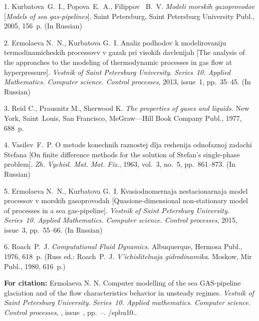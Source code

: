 

{\footnotesize

\vskip 4mm


\vskip 4mm

1.  Kurbatova~G.~I.,  Popova~E.~A.,  Filippov~ B.~V.
\textit{Modeli morskih gazoprovodov} [\textit{Models of sea
gas-pipelines}]. Saint Petersburg, Saint Petersburg University
Publ.,  2005, 156~p. (In Russian)

2.  Ermolaeva N.~N., Kurbatova G.~I. Analiz podhodov k
modelirovaniju termodinamicheskih processovv v gazah pri visokih
davlenijah [The analysis of the approaches to the modeling of
thermodynamic processes in gas flow at hyperpressure].
\textit{Vestnik of Saint Petersburg University. Series~10. Applied
Mathematics. Computer science. Control processes}, 2013, issue~1,
pp.~35--45. (In Russian)


3.  Reid  C., Prausnitz  M., Sherwood  K. \textit{The properties
of gases and liquids.} New  York, Saint~Louis, San Francisco,
MeGraw---Hill  Book  Company Publ., 1977, 688~p.


4. Vasilev~F.~P. O metode konechnih raznostej dlja reshenija
odnofaznoj zadachi Stefana [On finite difference methods for the
solution of Stefan's single-phase problem]. \textit{Zh. Vychisl.
Mat. Mat. Fiz.},    1963, vol.~3, no.~5, pp.~861--873. (In
Russian)

5.  Ermolaeva N.~N., Kurbatova G.~I. Kvasiodnomernaja
nestacionarnaja model processov v morskih gasoprovodah
[Quasione-dimensional non-stationary model of processes in a sea
gas-pipeline]. \emph{Vestnik of Saint Petersburg University.
Series~10. Applied Mathematics. Computer science. Control
processes}, 2015, issue~3, pp.~55--66. (In Russian)\newpage

6. Roach~P.~J. \textit{Computational Fluid Dynamics}. Albuquerque,
Hermosa Publ., 1976, 618~p. (Russ ed.: Roach~P.~J.
\emph{V'ichislitelnaja gidrodinamika}. Moskow, Mir Publ., 1980,
616~p.)


\vskip 2mm

{\bf For citation:} Ermolaeva N. N. Computer modelling of the sea
GAS-pipeline glaciation and of the flow characteristics behavior
in unsteady regimes. {\it Vestnik of Saint Petersburg University.
Series~10. Applied mathematics. Computer science. Control
processes}, \issueyear, issue~\issuenum,
pp.~\pageref{p7}--\pageref{p7e}.
\doivyp/spbu10.\issueyear.


}
